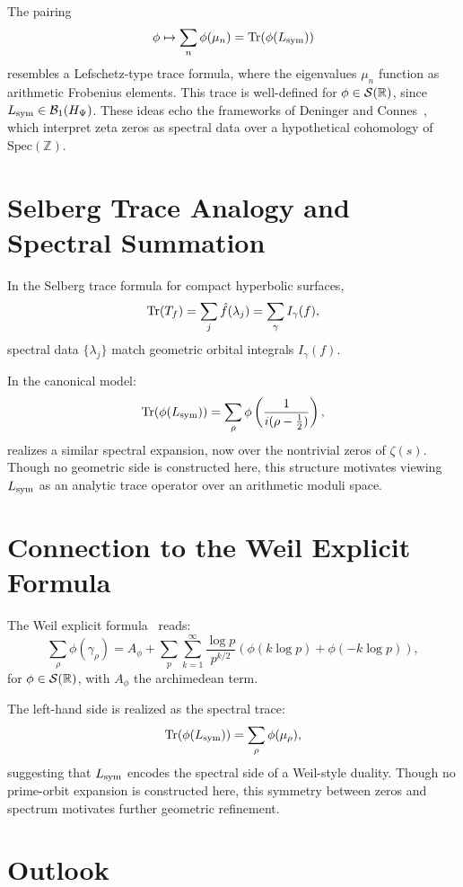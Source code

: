 The pairing
\[
\phi \mapsto \sum_n \phi(\mu_n) = \operatorname{Tr}(\phi(L_{\mathrm{sym}}))
\]
resembles a Lefschetz-type trace formula, where the eigenvalues \( \mu_n \) function as arithmetic Frobenius elements. This trace is well-defined for \( \phi \in \mathcal{S}(\mathbb{R}) \), since \( L_{\mathrm{sym}} \in \mathcal{B}_1(H_{\Psi}) \). These ideas echo the frameworks of Deninger and Connes~\cite{Deninger1998Frobenius, Connes1999TraceFormula}, which interpret zeta zeros as spectral data over a hypothetical cohomology of \( \mathrm{Spec}(\mathbb{Z}) \).

\section*{Selberg Trace Analogy and Spectral Summation}

In the Selberg trace formula for compact hyperbolic surfaces,
\[
\operatorname{Tr}(T_f) = \sum_j \hat{f}(\lambda_j) = \sum_\gamma I_\gamma(f),
\]
spectral data \( \{\lambda_j\} \) match geometric orbital integrals \( I_\gamma(f) \).

In the canonical model:
\[
\operatorname{Tr}(\phi(L_{\mathrm{sym}})) = \sum_\rho \phi\left( \frac{1}{i(\rho - \tfrac{1}{2})} \right),
\]
realizes a similar spectral expansion, now over the nontrivial zeros of \( \zeta(s) \). Though no geometric side is constructed here, this structure motivates viewing \( L_{\mathrm{sym}} \) as an analytic trace operator over an arithmetic moduli space.

\section*{Connection to the Weil Explicit Formula}

The Weil explicit formula~\cite{Weil1952Explicite, Edwards1974Zeta} reads:
\[
\sum_\rho \phi(\gamma_\rho) = A_\phi + \sum_p \sum_{k=1}^\infty \frac{\log p}{p^{k/2}} \left( \phi(k \log p) + \phi(-k \log p) \right),
\]
for \( \phi \in \mathcal{S}(\mathbb{R}) \), with \( A_\phi \) the archimedean term.

The left-hand side is realized as the spectral trace:
\[
\operatorname{Tr}(\phi(L_{\mathrm{sym}})) = \sum_\rho \phi(\mu_\rho),
\]
suggesting that \( L_{\mathrm{sym}} \) encodes the spectral side of a Weil-style duality. Though no prime-orbit expansion is constructed here, this symmetry between zeros and spectrum motivates further geometric refinement.

\section*{Outlook}

